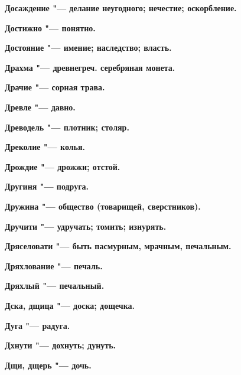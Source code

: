 \bfseries Досаждение \normalfont{} "--- делание неугодного; нечестие; оскорбление. 




\bfseries Достижно \normalfont{} "--- понятно. 




\bfseries Достояние \normalfont{} "--- имение; наследство; власть. 




\bfseries Драхма \normalfont{} "--- древнегреч. серебряная монета. 




\bfseries Драчие \normalfont{} "--- сорная трава. 




\bfseries Древле \normalfont{} "--- давно. 




\bfseries Древодель \normalfont{} "--- плотник; столяр. 




\bfseries Дреколие \normalfont{} "--- колья. 




\bfseries Дрождие \normalfont{} "--- дрожжи; отстой. 




\bfseries Другиня \normalfont{} "--- подруга. 




\bfseries Дружина \normalfont{} "--- общество (товарищей, сверстников). 




\bfseries Дручити \normalfont{} "--- удручать; томить; изнурять. 




\bfseries Дряселовати \normalfont{} "--- быть пасмурным, мрачным, печальным. 




\bfseries Дряхлование \normalfont{} "--- печаль. 




\bfseries Дряхлый \normalfont{} "--- печальный. 




\bfseries Дска, дщица \normalfont{} "--- доска; дощечка. 




\bfseries Дуга \normalfont{} "--- радуга. 




\bfseries Дхнути \normalfont{} "--- дохнуть; дунуть. 




\bfseries Дщи, дщерь \normalfont{} "--- дочь. 




